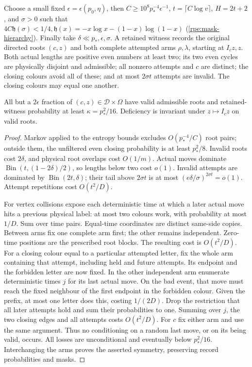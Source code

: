 Choose a small fixed $\epsilon=\epsilon(p_0,\eta)$, then $C\ge10^8p_*^{-4}\epsilon^{-1}$, $t=\lceil{}C\log{}v\rceil$, $H=2t+2$, and $\sigma>0$ such that \label{rpe:mask-hierarchy}$4C\mathfrak{h}(\sigma)<1/4,\mathfrak{h}(x)=-x\log{}x-(1-x)\log(1-x)$ \textup{(\ref{rpe:mask-hierarchy})}. Finally take $\delta\ll{}p_*,\epsilon,\sigma$. A retained witness records the original directed roots $(c,z)$ and both complete attempted arms $\rho,\lambda$, starting at $I_cz,z$. Both actual lengths are positive even numbers at least two; its two even cycles are physically disjoint and admissible;
all nonzero attempts and $c$ are distinct; the closing colours avoid all of these; and at most $2\sigma{}t$ attempts are invalid. The closing colours may equal one another.

\begin{lemma}\label{rpe:rich}
All but a $2\epsilon$ fraction of $(c,z)\in\mathcal{D}\times\Omega$ have valid admissible roots and retained-witness probability at least $\kappa=p_*^2/16$. Deficiency is invariant under $z\mapsto{}I_cz$ on valid roots.
\end{lemma}
\begin{proof}
Markov applied to the entropy bounds excludes $O(p_*^{-4}/C)$ root pairs; outside them, the unfiltered even closing probability is at least $p_*^2/8$. Invalid roots cost $2\delta$, and physical root overlaps cost $O(1/m)$. Actual moves dominate $\operatorname{Bin}(t,(1-2\delta)/2)$, so lengths below two cost $o(1)$. Invalid attempts are dominated by $\operatorname{Bin}(2t,\delta)$; their tail above $2\sigma{}t$ is at most $(e\delta/\sigma)^{2\sigma{}t}=o(1)$. Attempt repetitions cost $O(t^2/D)$.

For vertex collisions expose each deterministic time at which a later
actual move hits a previous physical label: at most two colours work,
with probability at most $1/D$. Sum over time pairs. Equal-time coordinates are distinct same-side copies. Between arms fix one
complete arm first; the other remains independent. Zero-time positions
are the prescribed root blocks. The resulting cost is $O(t^2/D)$. For a closing colour equal to a particular attempted letter, fix the
whole arm containing that attempt, including held and future attempts.
Its endpoint and the forbidden letter are now fixed. In the other
independent arm enumerate deterministic times $j$ for its last actual move. On the bad event, that move must reach the fixed neighbour of
the first endpoint in the forbidden colour. Given the prefix, at most
one letter does this, costing $1/(2D)$. Drop the restriction that all later attempts hold and sum their probabilities to one. Summing
over $j$, the two closing edges and all attempts costs $O(t^2/D)$. For $c$ fix either arm and use the same argument. Thus no conditioning on a random last move, or on its being valid, occurs. All losses are
unconditional and eventually below $p_*^2/16$. Interchanging the arms proves the asserted symmetry, preserving record probabilities and masks.
\end{proof}

